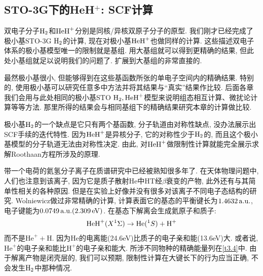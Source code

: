 \subsection{STO-3G下的HeH$^+$: SCF计算}
双电子分子$\mathrm{H}_2$和$\mathrm{HeH}^+$分别是同核/异核双原子分子的原型. 我们刚才已经完成了极小基STO-3G $\mathrm{H}_2$的计算, 现在对极小基$\mathrm{HeH}^+$也做同样的计算. 这些描述双电子体系的极小基模型唯一的限制就是基组. 用大基组就可以得到更精确的结果, 但此处小基组就足以说明我们的问题了. 扩展到大基组的非常直接的. 

最然极小基很小, 但能够得到在这些基函数所张的单电子空间内的精确结果. 特别的, 使用极小基可以研究任意多中方法并将其结果与``真实''结果作比较. 后面各章我们会用与此处相同的极小基STO $\mathrm{H}_2,\mathrm{HeH}^+$模型来说明组态相互计算、微扰论计算等等方法. 那里所得的结果会与相同基组下的精确结果研究本章的\hft 计算做比较.

极小基$\mathrm{H}_2$的一个缺点是它只有两个基函数, 分子轨道由对称性缺点, 没办法展示出SCF手续的迭代特性. 因为$\mathrm{HeH}^+$是异核分子, 它的对称性少于$\mathrm{H}_2$的, 而且这个极小基模型的分子轨道无法由对称性决定. 由此, 对$\mathrm{HeH}^+$做限制性\hft 计算就能完全展示求解Roothaan方程所涉及的原理. 

带一个电荷的氦氢分子离子在质谱研究中已经被熟知很多年了. 在天体物理问题中, 人们也注意到该离子, 因为它是质子散射$\mathrm{He}$中$\mathrm{HT}$经$\beta$衰变的产物, 此外还有与其简单性相关的各种原因. 但是在实验上好像并没有很多对该离子不同电子态结构的研究. Wolniewicz做过非常精确的计算, 计算表面它的基态的平衡键长为$1.4632\,\mathrm{a.u.}$, 电子键能为$0.0749\,\mathrm{a.u.}(2.309\,\mathrm{eV})$. 在基态下解离会生成氦原子和质子:
\begin{align}
\mathrm{HeH}^+(X^1\Sigma) \to \mathrm{He}(^1S) + \mathrm{H}^+
\end{align}
而不是$\mathrm{He}^+ + \mathrm{H}$. 因为$\mathrm{He}$的电离能(24.6eV)比质子的电子亲和能(13.6eV)大. 或者说, $\mathrm{He}^+$的电子亲和能比$\mathrm{H}^+$的电子亲和能大. 所涉不同物种的精确能量列在\ref{t3.4}中. 由于解离产物是闭壳层的, 我们可以预期, 限制性\hft 计算在大键长下的行为应当正确, 不会发生$\mathrm{H}_2$中那种情况. 

